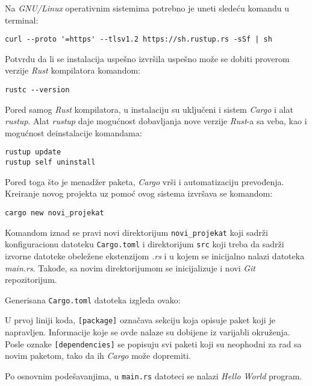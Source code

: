 \documentclass[12pt,oneside]{memoir}
\begin{document}
Na \emph{GNU/Linux} operativnim sistemima potrebno je uneti sledeću 
komandu u terminal:

\begin{lstlisting}[language={}, style=text]
curl --proto '=https' --tlsv1.2 https://sh.rustup.rs -sSf | sh
\end{lstlisting}

\noindent
Potvrdu da li se instalacija uspešno izvršila uspešno može se dobiti proverom verzije
\emph{Rust} kompilatora komandom:

\begin{lstlisting}[language={}, style=text]
rustc --version
\end{lstlisting}

Pored samog \emph{Rust} kompilatora, u instalaciju su uključeni i
sistem \emph{Cargo} i alat \emph{rustup}. Alat \emph{rustup} daje mogućnost
dobavljanja nove verzije \emph{Rust}-a sa veba, kao i 
mogućnost deinstalacije komandama:

\begin{lstlisting}[language={}, style=text]
rustup update
rustup self uninstall
\end{lstlisting}

Pored toga što je menadžer paketa, \emph{Cargo} vrši i automatizaciju
prevođenja. Kreiranje novog projekta uz pomoć ovog sistema izvršava
se komandom:

\begin{lstlisting}[language={}, style=text]
cargo new novi_projekat
\end{lstlisting}

Komandom iznad se pravi novi direktorijum \texttt{novi\_projekat} koji 
sadrži konfiguracionu datoteku \texttt{Cargo.toml} i direktorijum \texttt{src} koji treba da sadrži izvorne
datoteke obeležene ekstenzijom \emph{.rs}
i u kojem se inicijalno nalazi datoteka \emph{main.rs}. Takođe, sa novim direktorijumom se
inicijalizuje i novi \emph{Git} repozitorijum.

Generisana \texttt{Cargo.toml} datoteka izgleda ovako:



U prvoj liniji koda, \texttt{[package]} označava sekciju koja opisuje 
paket koji je napravljen. Informacije koje se ovde nalaze su dobijene
iz varijabli okruženja. Posle oznake \texttt{[dependencies]} se 
popisuju svi paketi koji su neophodni za rad sa novim paketom, 
tako da ih \emph{Cargo} može dopremiti.

Po osnovnim podešavanjima, u \texttt{main.rs} datoteci se nalazi
\emph{Hello World} program.
\end{document}
